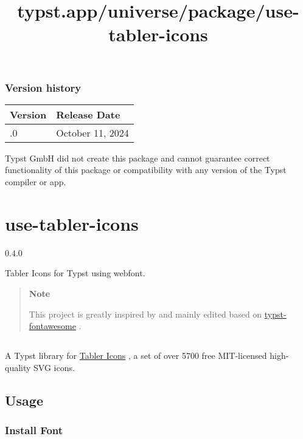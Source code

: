 \label{versions}
\subsubsection{Version history}\label{version-history}

\begin{longtable}[]{@{}ll@{}}
\toprule\noalign{}
Version & Release Date \\
\midrule\noalign{}
\endhead
\bottomrule\noalign{}
\endlastfoot
0.1.0 & October 11, 2024 \\
\end{longtable}

Typst GmbH did not create this package and cannot guarantee correct
functionality of this package or compatibility with any version of the
Typst compiler or app.


\title{typst.app/universe/package/use-tabler-icons}

\label{banner}
\section{use-tabler-icons}\label{use-tabler-icons}

{ 0.4.0 }

Tabler Icons for Typst using webfont.

\label{readme}
\begin{quote}
\textbf{Note}

This project is greatly inspired by and mainly edited based on
\href{https://github.com/duskmoon314/typst-fontawesome}{typst-fontawesome}
.
\end{quote}

\subsection{\texorpdfstring{\protect\pandocbounded{}}{use-tabler-icons}}\label{use-tabler-icons-1}

A Typst library for \href{https://github.com/tabler/tabler-icons}{Tabler
Icons} , a set of over 5700 free MIT-licensed high-quality SVG icons.

\subsection{Usage}\label{usage}

\subsubsection{Install Font}\label{install-font}

